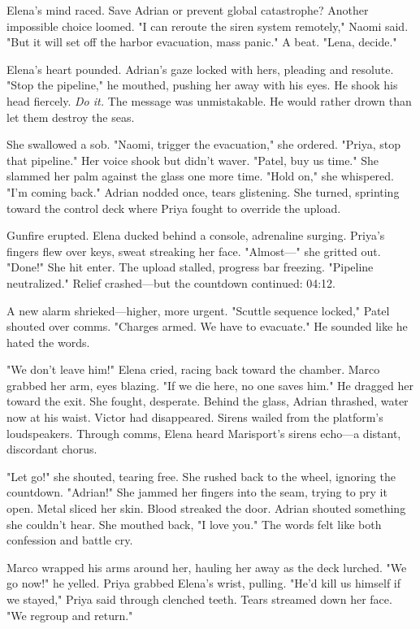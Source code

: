 Elena's mind raced. Save Adrian or prevent global catastrophe? Another impossible choice loomed. "I can reroute the siren system remotely," Naomi said. "But it will set off the harbor evacuation, mass panic." A beat. "Lena, decide."

Elena's heart pounded. Adrian's gaze locked with hers, pleading and resolute. "Stop the pipeline," he mouthed, pushing her away with his eyes. He shook his head fiercely. \textit{Do it.} The message was unmistakable. He would rather drown than let them destroy the seas.

She swallowed a sob. "Naomi, trigger the evacuation," she ordered. "Priya, stop that pipeline." Her voice shook but didn't waver. "Patel, buy us time." She slammed her palm against the glass one more time. "Hold on," she whispered. "I'm coming back." Adrian nodded once, tears glistening. She turned, sprinting toward the control deck where Priya fought to override the upload.

Gunfire erupted. Elena ducked behind a console, adrenaline surging. Priya's fingers flew over keys, sweat streaking her face. "Almost—" she gritted out. "Done!" She hit enter. The upload stalled, progress bar freezing. "Pipeline neutralized." Relief crashed—but the countdown continued: 04:12.

A new alarm shrieked—higher, more urgent. "Scuttle sequence locked," Patel shouted over comms. "Charges armed. We have to evacuate." He sounded like he hated the words.

"We don't leave him!" Elena cried, racing back toward the chamber. Marco grabbed her arm, eyes blazing. "If we die here, no one saves him." He dragged her toward the exit. She fought, desperate. Behind the glass, Adrian thrashed, water now at his waist. Victor had disappeared. Sirens wailed from the platform's loudspeakers. Through comms, Elena heard Marisport's sirens echo—a distant, discordant chorus.

"Let go!" she shouted, tearing free. She rushed back to the wheel, ignoring the countdown. "Adrian!" She jammed her fingers into the seam, trying to pry it open. Metal sliced her skin. Blood streaked the door. Adrian shouted something she couldn't hear. She mouthed back, "I love you." The words felt like both confession and battle cry.

Marco wrapped his arms around her, hauling her away as the deck lurched. "We go now!" he yelled. Priya grabbed Elena's wrist, pulling. "He'd kill us himself if we stayed," Priya said through clenched teeth. Tears streamed down her face. "We regroup and return."

